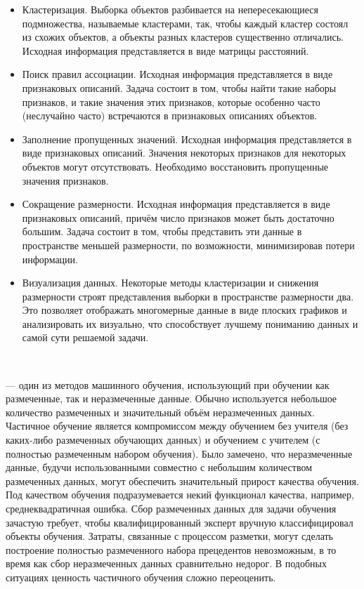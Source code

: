 \begin{itemize}
  \item Кластеризация. Выборка объектов разбивается на непересекающиеся подмножества, называемые кластерами, так, чтобы каждый кластер состоял из схожих объектов, а объекты разных кластеров существенно отличались. Исходная информация представляется в виде матрицы расстояний.
  \item Поиск правил ассоциации. Исходная информация представляется в виде признаковых описаний. Задача состоит в том, чтобы найти такие наборы признаков, и такие значения этих признаков, которые особенно часто (неслучайно часто) встречаются в признаковых описаниях объектов.
  \item Заполнение пропущенных значений. Исходная информация представляется в виде признаковых описаний. Значения некоторых признаков для некоторых объектов могут отсутствовать. Необходимо восстановить пропущенные значения признаков.
  \item Сокращение размерности. Исходная информация представляется в виде признаковых описаний, причём число признаков может быть достаточно большим. Задача состоит в том, чтобы представить эти данные в пространстве меньшей размерности, по возможности, минимизировав потери информации.
  \item Визуализация данных. Некоторые методы кластеризации и снижения размерности строят представления выборки в пространстве размерности два. Это позволяет отображать многомерные данные в виде плоских графиков и анализировать их визуально, что способствует лучшему пониманию данных и самой сути решаемой задачи.
\end{itemize}
\

— один из методов машинного обучения, использующий при обучении как размеченные, так и неразмеченные данные. Обычно используется небольшое количество размеченных и значительный объём неразмеченных данных. Частичное обучение является компромиссом между обучением без учителя (без каких-либо размеченных обучающих данных) и обучением с учителем (с полностью размеченным набором обучения). Было замечено, что неразмеченные данные, будучи использованными совместно с небольшим количеством размеченных данных, могут обеспечить значительный прирост качества обучения. Под качеством обучения подразумевается некий функционал качества, например, среднеквадратичная ошибка. Сбор размеченных данных для задачи обучения зачастую требует, чтобы квалифицированный эксперт вручную классифицировал объекты обучения. Затраты, связанные с процессом разметки, могут сделать построение полностью размеченного набора прецедентов невозможным, в то время как сбор неразмеченных данных сравнительно недорог. В подобных ситуациях ценность частичного обучения сложно переоценить. \\

